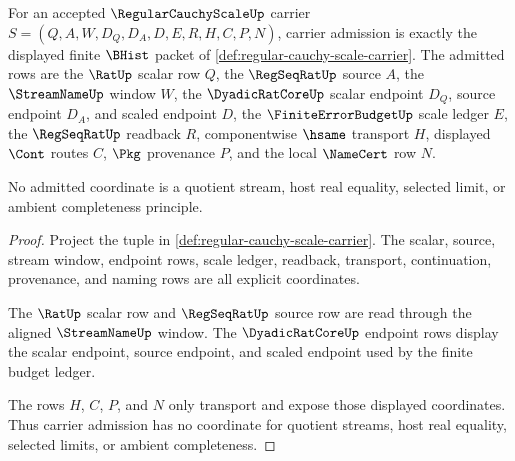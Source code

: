 \begin{theorem}
\label{thm:regularcauchyscale-scale-carrier-obligation}
For an accepted $\RegularCauchyScaleUp$ carrier $S=(Q,A,W,D_Q,D_A,D,E,R,H,C,P,N)$, carrier admission is exactly the displayed finite $\BHist$ packet of \autoref{def:regular-cauchy-scale-carrier}. The admitted rows are the $\RatUp$ scalar row $Q$, the $\RegSeqRatUp$ source $A$, the $\StreamNameUp$ window $W$, the $\DyadicRatCoreUp$ scalar endpoint $D_Q$, source endpoint $D_A$, and scaled endpoint $D$, the $\FiniteErrorBudgetUp$ scale ledger $E$, the $\RegSeqRatUp$ readback $R$, componentwise $\hsame$ transport $H$, displayed $\Cont$ routes $C$, $\Pkg$ provenance $P$, and the local $\NameCert$ row $N$.

No admitted coordinate is a quotient stream, host real equality, selected limit, or ambient completeness principle.
\end{theorem}
\begin{proof}
Project the tuple in \autoref{def:regular-cauchy-scale-carrier}. The scalar, source, stream window, endpoint rows, scale ledger, readback, transport, continuation, provenance, and naming rows are all explicit coordinates.

The $\RatUp$ scalar row and $\RegSeqRatUp$ source row are read through the aligned $\StreamNameUp$ window. The $\DyadicRatCoreUp$ endpoint rows display the scalar endpoint, source endpoint, and scaled endpoint used by the finite budget ledger.

The rows $H$, $C$, $P$, and $N$ only transport and expose those displayed coordinates. Thus carrier admission has no coordinate for quotient streams, host real equality, selected limits, or ambient completeness.
\end{proof}

